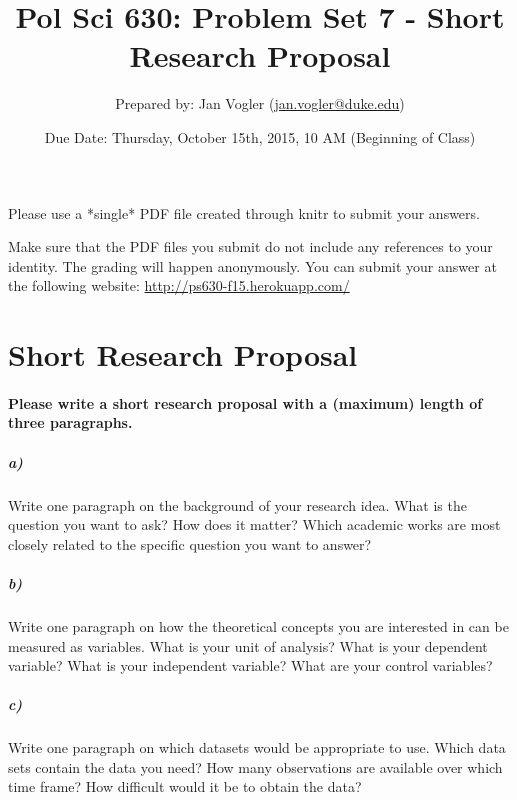 \documentclass[12pt]{article}
\begin{document}
\title{Pol Sci 630: Problem Set 7 - Short Research Proposal}

\author{Prepared by: Jan Vogler (\href{mailto:jan.vogler@duke.edu}{jan.vogler@duke.edu})}

\date{Due Date: Thursday, October 15th, 2015, 10 AM (Beginning of Class)}
 
\maketitle 



Please use a *single* PDF file created through knitr to submit your answers.

Make sure that the PDF files you submit do not include any references to your identity. The grading will happen anonymously. You can submit your answer at the following website: \url{http://ps630-f15.herokuapp.com/}



\section*{Short Research Proposal}

\paragraph{Please write a short research proposal with a (maximum) length of three paragraphs.}

\subparagraph{a)} Write one paragraph on the background of your research idea. What is the question you want to ask? How does it matter? Which academic works are most closely related to the specific question you want to answer?

\subparagraph{b)} Write one paragraph on how the theoretical concepts you are interested in can be measured as variables. What is your unit of analysis? What is your dependent variable? What is your independent variable? What are your control variables?

\subparagraph{c)} Write one paragraph on which datasets would be appropriate to use. Which data sets contain the data you need? How many observations are available over which time frame? How difficult would it be to obtain the data?
\end{document}
